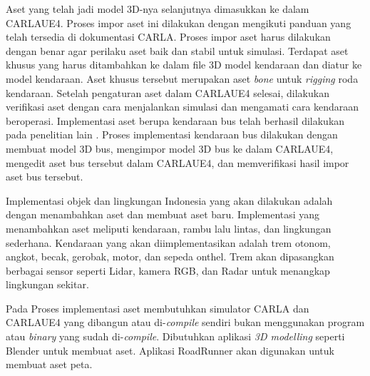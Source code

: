 Aset yang telah jadi model 3D-nya selanjutnya dimasukkan ke dalam CARLAUE4.
Proses impor aset ini dilakukan dengan mengikuti panduan yang telah tersedia di
dokumentasi CARLA. Proses impor aset harus dilakukan dengan benar agar perilaku
aset baik dan stabil untuk simulasi. Terdapat aset khusus yang harus ditambahkan
ke dalam file 3D model kendaraan dan diatur ke model kendaraan. Aset khusus
tersebut merupakan aset \textit{bone} untuk \textit{rigging} roda kendaraan.
Setelah pengaturan aset dalam CARLAUE4 selesai, dilakukan verifikasi aset dengan
cara menjalankan simulasi dan mengamati cara kendaraan beroperasi. Implementasi
aset berupa kendaraan bus telah berhasil dilakukan pada penelitian lain
\parencite{related-work-xiang}. Proses implementasi kendaraan bus dilakukan
dengan membuat model 3D bus, mengimpor model 3D bus ke dalam CARLAUE4, mengedit
aset bus tersebut dalam CARLAUE4, dan memverifikasi hasil impor aset bus
tersebut.


Implementasi objek dan lingkungan Indonesia yang akan dilakukan adalah dengan
menambahkan aset dan membuat aset baru. Implementasi yang menambahkan aset
meliputi kendaraan, rambu lalu lintas, dan lingkungan sederhana. Kendaraan yang
akan diimplementasikan adalah trem otonom, angkot, becak, gerobak, motor, dan
sepeda onthel. Trem akan dipasangkan berbagai sensor seperti Lidar, kamera RGB,
dan Radar untuk menangkap lingkungan sekitar.



Pada Proses implementasi aset membutuhkan simulator CARLA dan CARLAUE4 yang
dibangun atau di-\textit{compile} sendiri bukan menggunakan program atau
\textit{binary} yang sudah di-\textit{compile}.
Dibutuhkan aplikasi \textit{3D modelling} seperti Blender untuk membuat aset.
Aplikasi RoadRunner akan digunakan untuk membuat aset peta.

